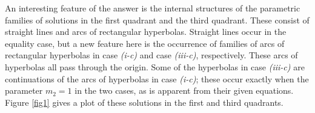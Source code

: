 \documentclass[12pt,letterpaper, reqno]{amsart}
\theoremstyle{definition}
\theoremstyle{remark}
\begin{document}
An  interesting feature of the answer is the  internal structures of the parametric families of solutions in
the first quadrant 
and the third quadrant. These consist of straight lines and arcs of rectangular hyperbolas.
Straight lines occur  in the equality case, but a new feature here 
 is the occurrence of families of arcs of rectangular hyperbolas  in
case {\it (i-c)} and case {\it (iii-c)}, respectively. These arcs of hyperbolas all pass through the origin.
Some of the  hyperbolas in case {\it (iii-c)} are continuations of the arcs of hyperbolas
in case {\it (i-c)}; these occur exactly when the parameter $m_2=1$ in the two cases,
as is apparent from their given equations. 
Figure \ref{fig1} gives a
plot of these solutions in the first and third quadrants.

%
\end{document}
